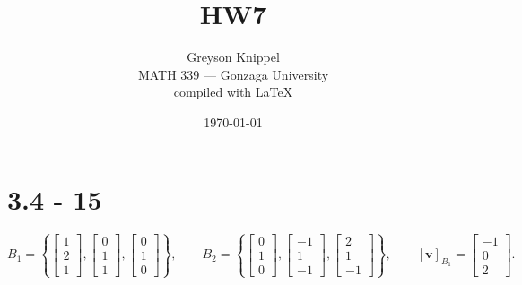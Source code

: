 \documentclass{article}
\title{HW7}
\author{
Greyson Knippel \\[4pt]
MATH 339 --- Gonzaga University \\[4pt]
compiled with \LaTeX{}
}
\date{\today}
\begin{document}
\maketitle

\section*{3.4 - 15}

\[
B_1 = \left\{
\begin{bmatrix} 1 \\ 2 \\ 1 \end{bmatrix},
\begin{bmatrix} 0 \\ 1 \\ 1 \end{bmatrix},
\begin{bmatrix} 0 \\ 1 \\ 0 \end{bmatrix}
\right\},
\qquad
B_2 = \left\{
\begin{bmatrix} 0 \\ 1 \\ 0 \end{bmatrix},
\begin{bmatrix} -1 \\ 1 \\ -1 \end{bmatrix},
\begin{bmatrix} 2 \\ 1 \\ -1 \end{bmatrix}
\right\},
\qquad
[\mathbf{v}]_{B_1} = \begin{bmatrix} -1 \\ 0 \\ 2 \end{bmatrix}.
\]
\end{document}
